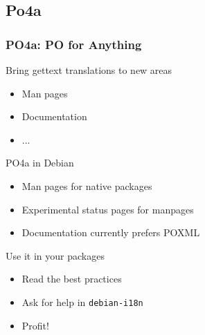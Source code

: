 \documentclass{beamer}
\begin{document}

\subsection{Po4a}

\begin{frame}
  \frametitle{PO4a: PO for Anything}
	\begin{block}
		{Bring gettext translations to new areas}
		\begin{itemize}
		\item
			Man pages
		\item
			Documentation
		\item
			...
		\end{itemize}
	\end{block}
	\begin{block}
		{PO4a in Debian}
		\begin{itemize}
		\item
			Man pages for native packages
		\item
			Experimental status pages for manpages
		\item
			Documentation currently prefers POXML
		\end{itemize}
	\end{block}
	\begin{block}
		{Use it in your packages}
		\begin{itemize}
		\item
			Read the best practices
		\item
			{Ask for help in \texttt{debian-i18n}}
		\item
			Profit!
		\end{itemize}
	\end{block}
\end{frame}
\end{document}
